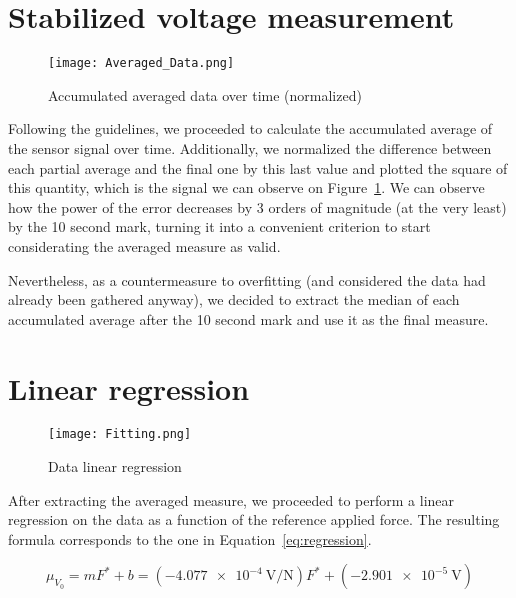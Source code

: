 \documentclass[12pt]{article}
\begin{document}
\section{Stabilized voltage measurement} \label{sec:stabilized_signal}

        \begin{figure}[!ht]
                \texttt{[image: Averaged\_Data.png]}
                \centering
                \caption{Accumulated averaged data over time (normalized)}
                \label{fig:averaged}
        \end{figure}

        Following the guidelines, we proceeded to calculate the accumulated average of the sensor signal over time. Additionally, we normalized the difference between each partial average and the final one by this last value and plotted the square of this quantity, which is the signal we can observe on Figure~\ref{fig:averaged}. We can observe how the power of the error decreases by 3 orders of magnitude (at the very least) by the 10 second mark, turning it into a convenient criterion to start considerating the averaged measure as valid.

        Nevertheless, as a countermeasure to overfitting (and considered the data had already been gathered anyway), we decided to extract the median of each accumulated average after the 10 second mark and use it as the final measure.

\section{Linear regression} \label{sec:lin_regression}

        \begin{figure}[!ht]
                \texttt{[image: Fitting.png]}
                \centering
                \caption{Data linear regression}
                \label{fig:regression}
        \end{figure}

        After extracting the averaged measure, we proceeded to perform a linear regression on the data as a function of the reference applied force. The resulting formula corresponds to the one in Equation~\ref{eq:regression}.

        \begin{equation} \label{eq:regression}
                \mu_{V_0} = m F^{*} + b = (\SI{-4.077e-4}{\volt\per\newton}) F^{*} + (\SI{-2.901e-5}{\volt})
        \end{equation}
\end{document}
